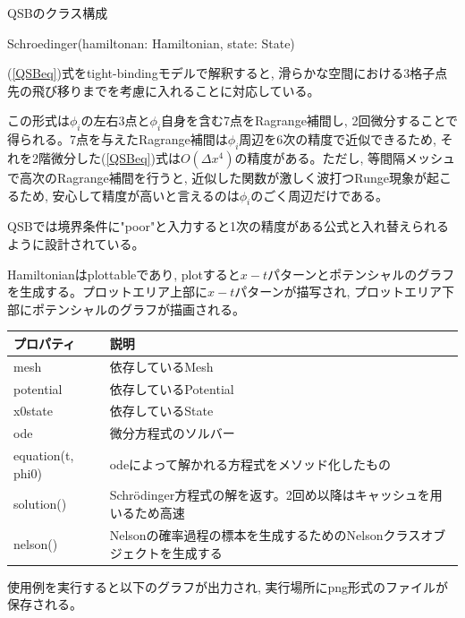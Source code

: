 \documentclass[a4paper, lualatex]{bxjsarticle}
\newcommand{\eref}[1]{(\ref{#1})式}
\begin{document}
\begin{section}{QSBのクラス構成\label{AppQ}}
\begin{subsection}{Schroedinger(hamiltonan: Hamiltonian, state: State)}
        \par \eref{QSBeq}をtight-bindingモデルで解釈すると, 滑らかな空間における3格子点先の飛び移りまでを考慮に入れることに対応している。
        \par この形式は$\phi_i$の左右3点と$\phi_i$自身を含む7点をRagrange補間し, 2回微分することで得られる。7点を与えたRagrange補間は$\phi_i$周辺を6次の精度で近似できるため, それを2階微分した\eref{QSBeq}は$O(\varDelta x^4)$の精度がある。ただし, 等間隔メッシュで高次のRagrange補間を行うと, 近似した関数が激しく波打つRunge現象が起こるため, 安心して精度が高いと言えるのは$\phi_i$のごく周辺だけである。
        \par QSBでは境界条件に"poor"と入力すると1次の精度がある公式と入れ替えられるように設計されている。
        \par Hamiltonianはplottableであり, plotすると$x-t$パターンとポテンシャルのグラフを生成する。プロットエリア上部に$x-t$パターンが描写され, プロットエリア下部にポテンシャルのグラフが描画される。
        \begin{table}[h]
            \begin{tabular}{ll}
                プロパティ & 説明\\ \hline
                mesh & 依存しているMesh\\
                potential & 依存しているPotential\\
                x0state & 依存しているState\\
                ode & 微分方程式のソルバー\\
                equation(t, phi0) & odeによって解かれる方程式をメソッド化したもの\\
                solution() & Schrödinger方程式の解を返す。2回め以降はキャッシュを用いるため高速\\
                nelson() & Nelsonの確率過程の標本を生成するためのNelsonクラスオブジェクトを生成する\\
            \end{tabular}
        \end{table}
        
        使用例を実行すると以下のグラフが出力され, 実行場所にpng形式のファイルが保存される。
        \begin{figure}[h]
            \begin{minipage}{0.5\hsize}
                \centering

\end{minipage}
\end{figure}
\end{subsection}
\end{section}
\end{document}
